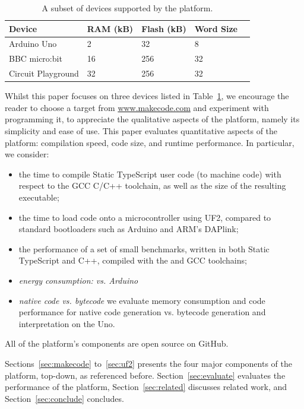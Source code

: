 \begin{table}[]
\centering
\begin{tabular}{|l|l|l|l|l|}
\hline
Device             & RAM (kB) & Flash (kB) & Word Size        \\ \hline
Arduino Uno        & 2        & 32         & 8               \\ \hline
BBC micro:bit      & 16       & 256        & 32              \\ \hline
Circuit Playground & 32       & 256        & 32              \\ \hline
\end{tabular}
\caption{\label{table:devices}A subset of devices supported by the platform.}
\end{table}
Whilst this paper focuses on three devices listed in Table~\ref{table:devices}, we encourage the reader to choose a target
from \url{www.makecode.com} and experiment with programming it, to appreciate the
qualitative aspects of the platform, namely its simplicity and ease of use.
This paper evaluates quantitative aspects of the platform:
compilation speed, code size, and runtime performance.  In particular, we
consider:
\begin{itemize}
\item the time to compile Static TypeScript user code (to machine code) with respect
      to the GCC C/C++ toolchain, as well as the size of the resulting executable;
\item the time to load code onto a microcontroller using UF2, compared to standard bootloaders
      such as Arduino and ARM's DAPlink;
\item the performance of a set of small benchmarks, written in both Static TypeScript and C++,
      compiled with the \MC and GCC toolchains;
\item \emph{energy consumption: \CO vs. Arduino}
\item \emph{native code vs. bytecode} we
      evaluate memory consumption and code performance for native code generation
      vs. bytecode generation and interpretation on the Uno.
\end{itemize}


All of the platform's components are open source on GitHub.
  
Sections~\ref{sec:makecode} to~\ref{sec:uf2} presents the four major components of the platform, top-down,
as referenced before. Section~\ref{sec:evaluate} evaluates the performance of the platform,
Section~\ref{sec:related} discusses related work, and Section~\ref{sec:conclude}
concludes.
